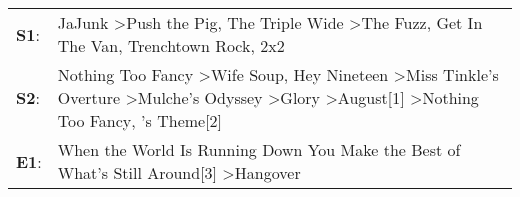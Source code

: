 \begin{supertabular}{p{0.03\textwidth}p{0.92\textwidth}}
 \textbf{S1}:  &                                                                                                                                                           JaJunk\textsuperscript{} \textgreater \enspace Push the Pig\textsuperscript{}, \enspace The Triple Wide\textsuperscript{} \textgreater \enspace The Fuzz\textsuperscript{}, \enspace Get In The Van\textsuperscript{}, \enspace Trenchtown Rock\textsuperscript{}, \enspace 2x2\textsuperscript{}  \enspace  \\
 \textbf{S2}:  &  Nothing Too Fancy\textsuperscript{} \textgreater \enspace Wife Soup\textsuperscript{}, \enspace Hey Nineteen\textsuperscript{} \textgreater \enspace Miss Tinkle's Overture\textsuperscript{} \textgreater \enspace Mulche's Odyssey\textsuperscript{} \textgreater \enspace Glory\textsuperscript{} \textgreater \enspace August[1]\textsuperscript{} \textgreater \enspace Nothing Too Fancy\textsuperscript{}, 's Theme[2]\textsuperscript{}  \enspace  \\
 \textbf{E1}:  &                                                                                                                                                                                                                                                                                                               When the World Is Running Down You Make the Best of What's Still Around[3]\textsuperscript{} \textgreater \enspace Hangover\textsuperscript{}  \enspace  \\
\end{supertabular}
